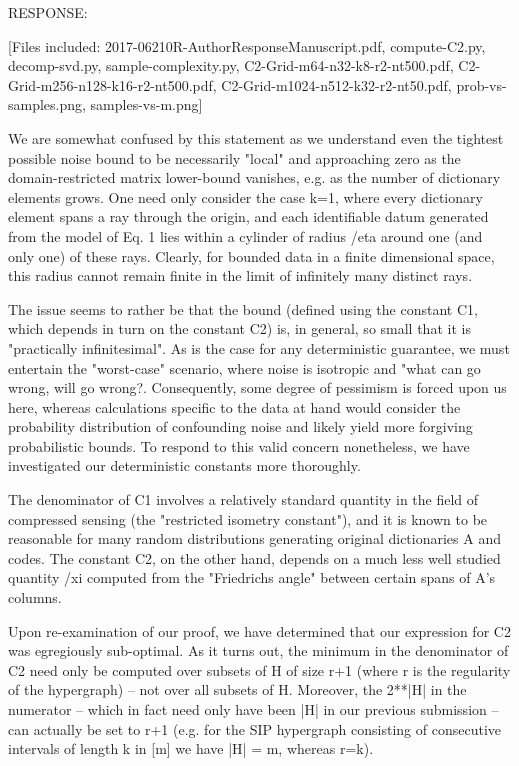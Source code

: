 RESPONSE:

[Files included: 2017-06210R-AuthorResponseManuscript.pdf, compute-C2.py, decomp-svd.py, sample-complexity.py, C2-Grid-m64-n32-k8-r2-nt500.pdf, C2-Grid-m256-n128-k16-r2-nt500.pdf, C2-Grid-m1024-n512-k32-r2-nt50.pdf, prob-vs-samples.png, samples-vs-m.png]

We are somewhat confused by this statement as we understand even the tightest possible noise bound to be necessarily "local" and approaching zero as the domain-restricted matrix lower-bound vanishes, e.g. as the number of dictionary elements grows. One need only consider the case k=1, where every dictionary element spans a ray through the origin, and each identifiable datum generated from the model of Eq. 1 lies within a cylinder of radius /eta around one (and only one) of these rays. Clearly, for bounded data in a finite dimensional space, this radius cannot remain finite in the limit of infinitely many distinct rays.

The issue seems to rather be that the bound (defined using the constant C1, which depends in turn on the constant C2) is, in general, so small that it is "practically infinitesimal". As is the case for any deterministic guarantee, we must entertain the "worst-case" scenario, where noise is isotropic and "what can go wrong, will go wrong?. Consequently, some degree of pessimism is forced upon us here, whereas calculations specific to the data at hand would consider the probability distribution of confounding noise and likely yield more forgiving probabilistic bounds. To respond to this valid concern nonetheless, we have investigated our deterministic constants more thoroughly.

The denominator of C1 involves a relatively standard quantity in the field of compressed sensing (the "restricted isometry constant"), and it is known to be reasonable for many random distributions generating original dictionaries A and codes. The constant C2, on the other hand, depends on a much less well studied quantity /xi computed from the "Friedrichs angle" between certain spans of A's columns. 

Upon re-examination of our proof, we have determined that our expression for C2 was egregiously sub-optimal. As it turns out, the minimum in the denominator of C2 need only be computed over subsets of H of size r+1 (where r is the regularity of the hypergraph) -- not over all subsets of H. Moreover, the 2**|H| in the numerator -- which in fact need only have been |H| in our previous submission -- can actually be set to r+1 (e.g. for the SIP hypergraph consisting of consecutive intervals of length k in [m] we have |H| = m, whereas r=k).

